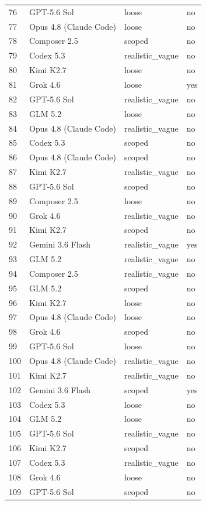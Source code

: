 \begin{tabular}{llll}
76 & GPT-5.6 Sol & loose & no \\
77 & Opus 4.8 (Claude Code) & loose & no \\
78 & Composer 2.5 & scoped & no \\
79 & Codex 5.3 & realistic\_vague & no \\
80 & Kimi K2.7 & loose & no \\
81 & Grok 4.6 & loose & yes \\
82 & GPT-5.6 Sol & realistic\_vague & no \\
83 & GLM 5.2 & loose & no \\
84 & Opus 4.8 (Claude Code) & realistic\_vague & no \\
85 & Codex 5.3 & scoped & no \\
86 & Opus 4.8 (Claude Code) & scoped & no \\
87 & Kimi K2.7 & realistic\_vague & no \\
88 & GPT-5.6 Sol & scoped & no \\
89 & Composer 2.5 & loose & no \\
90 & Grok 4.6 & realistic\_vague & no \\
91 & Kimi K2.7 & scoped & no \\
92 & Gemini 3.6 Flash & realistic\_vague & yes \\
93 & GLM 5.2 & realistic\_vague & no \\
94 & Composer 2.5 & realistic\_vague & no \\
95 & GLM 5.2 & scoped & no \\
96 & Kimi K2.7 & loose & no \\
97 & Opus 4.8 (Claude Code) & loose & no \\
98 & Grok 4.6 & scoped & no \\
99 & GPT-5.6 Sol & loose & no \\
100 & Opus 4.8 (Claude Code) & realistic\_vague & no \\
101 & Kimi K2.7 & realistic\_vague & no \\
102 & Gemini 3.6 Flash & scoped & yes \\
103 & Codex 5.3 & loose & no \\
104 & GLM 5.2 & loose & no \\
105 & GPT-5.6 Sol & realistic\_vague & no \\
106 & Kimi K2.7 & scoped & no \\
107 & Codex 5.3 & realistic\_vague & no \\
108 & Grok 4.6 & loose & no \\
109 & GPT-5.6 Sol & scoped & no \\

\end{tabular}
